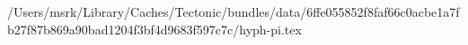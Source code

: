 /Users/msrk/Library/Caches/Tectonic/bundles/data/6ffe055852f8faf66c0acbe1a7fb27f87b869a90bad1204f3bf4d9683f597c7c/hyph-pi.tex